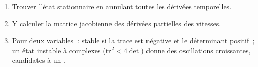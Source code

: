 \begin{method}\label{met:b3:complex-kinetics:stability}
\begin{enumerate}
  \item Trouver l'état stationnaire en annulant toutes les dérivées
        temporelles.
  \item Y calculer la matrice jacobienne des dérivées partielles des
        vitesses.
  \item Pour deux variables~: stable si la trace est négative et le
        déterminant positif~; un état instable à 
        complexes
        ($\mathrm{tr}^2 < 4\det$) donne des oscillations croissantes,
        candidates à un .
\end{enumerate}
\end{method}

